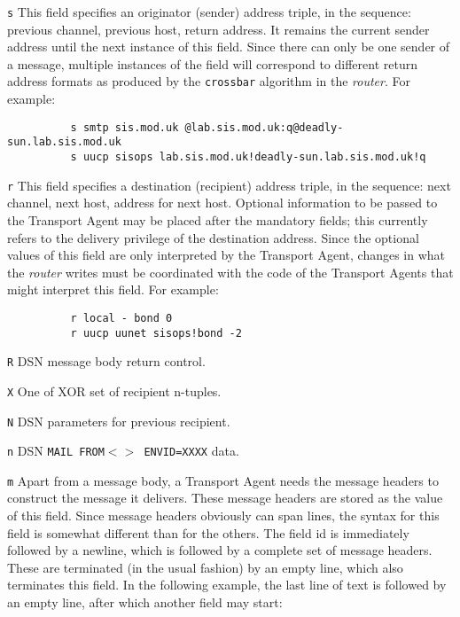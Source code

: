 {\tt s}     
This field specifies an originator (sender) address triple, in the
sequence: previous channel, previous host, return address.  It remains
the current sender address until the next instance of this field.
Since there can only be one sender of a message, multiple instances of
the field will correspond to different return address formats as
produced by the {\tt crossbar} algorithm in the {\em router\/}.
For example:

\begin{tscreen}
\begin{verbatim}
          s smtp sis.mod.uk @lab.sis.mod.uk:q@deadly-sun.lab.sis.mod.uk
          s uucp sisops lab.sis.mod.uk!deadly-sun.lab.sis.mod.uk!q
\end{verbatim}
\end{tscreen}


{\tt r}     
This field specifies a destination (recipient) address triple, in the
sequence: next channel, next host, address for next host.  Optional
information to be passed to the Transport Agent may be placed after the
mandatory fields; this currently refers to the delivery privilege of the
destination address.  Since the optional values of this field are only
interpreted by the Transport Agent, changes in what the {\em router\/} writes
must be coordinated with the code of the Transport Agents that might
interpret this field.  For example:

\begin{tscreen}
\begin{verbatim}
          r local - bond 0
          r uucp uunet sisops!bond -2
\end{verbatim}
\end{tscreen}


{\tt R}
DSN message body return control.

{\tt X}
One of XOR set of recipient n-tuples.

{\tt N}
DSN parameters for previous recipient.

{\tt n}
DSN {\tt MAIL FROM{\(<\)}{\(>\)} ENVID=XXXX} data.

{\tt m}     
Apart from a message body, a Transport Agent needs the message headers
to construct the message it delivers.  These message headers are
stored as the value of this field.  Since message headers obviously
can span lines, the syntax for this field is somewhat different than
for the others.  The field id is immediately followed by a newline,
which is followed by a complete set of message headers.  These are
terminated (in the usual fashion) by an empty line, which also
terminates this field.  In the following example, the last line of
text is followed by an empty line, after which another field may
start:

